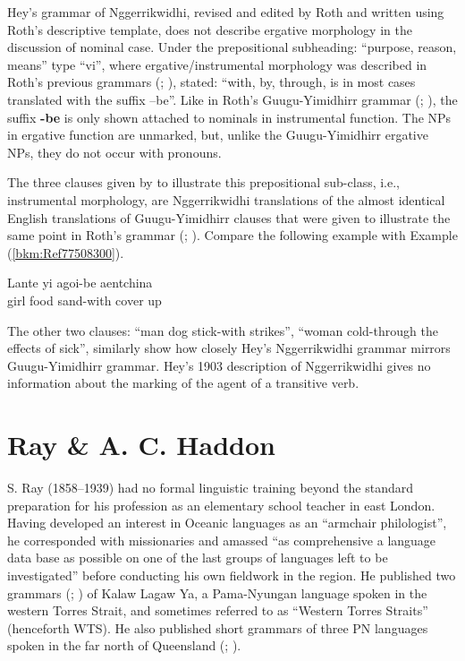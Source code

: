 Hey’s \citeyear{hey_elementary_1903} grammar of Nggerrikwidhi, revised and edited by Roth and written using Roth’s descriptive template, does not describe ergative morphology in the discussion of nominal case. Under the prepositional subheading: ``purpose, reason, means'' type ``vi'', where ergative/instrumental morphology was described in Roth’s previous grammars (\citeyear{roth_ethnological_1897}; \citeyear{roth_structure_1901}), \citet[21]{hey_elementary_1903} stated: “with, by, through, is in most cases translated with the suffix –be”. Like in Roth’s Guugu-Yimidhirr grammar (\citeyear{roth_structure_1901}; ), the suffix \textbf{-be }is only shown attached to nominals in instrumental function. The NPs in ergative function are unmarked, but, unlike the Guugu-Yimidhirr ergative NPs, they do not occur with pronouns.

The three clauses given by \citet[21]{hey_elementary_1903} to illustrate this prepositional sub-class, i.e., instrumental morphology, are Nggerrikwidhi translations of the almost identical English translations of Guugu-Yimidhirr clauses that were given to illustrate the same point in Roth’s grammar (\citeyear{roth_structure_1901}; ). Compare the following example with Example (\ref{bkm:Ref77508300}).

\ea \label{bkm:Ref77508359}
\gll   Lante    yi     agoi-be       aentchina\\
girl      food     sand-with   cover{ }up\\
\citep[21]{hey_elementary_1903}
\z

The other two clauses: “man dog stick-with strikes”, “woman cold-through the effects of sick”, similarly show how closely Hey’s Nggerrikwidhi \citeyearpar{hey_elementary_1903} grammar mirrors  Guugu-Yimidhirr grammar. Hey’s 1903 description of Nggerrikwidhi gives no information about the marking of the agent of a transitive verb.

\section{Ray \& A. C. Haddon}
\label{sec:key:10.2}\label{bkm:Ref516423313}\label{bkm:Ref514607856}

S. Ray (1858--1939) had no formal linguistic training beyond the standard preparation for his profession as an elementary school teacher in east London. Having developed an interest in Oceanic languages as an “armchair philologist'', he corresponded with missionaries and amassed “as comprehensive a language data base as possible on one of the last groups of languages left to be investigated” \citep[183]{shnukal_at_1998} before conducting his own fieldwork in the region. He published two grammars (\citeyear{ray_study_1893}; \citeyear{ray_linguistics_1907}) of Kalaw Lagaw Ya, a Pama-Nyungan language spoken in the western Torres Strait, and sometimes referred to as “Western Torres Straits” (henceforth WTS). He also published short grammars of three PN languages spoken in the far north of Queensland (\citeyear{ray_linguistics_1907}; ).


